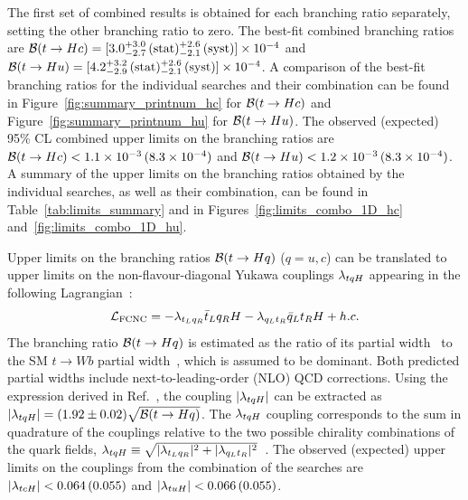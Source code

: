 The first set of combined results is obtained for each branching ratio separately, setting the other branching ratio to zero.
The best-fit combined branching ratios are $\mathcal{B}(t\to Hc)=[3.0^{+3.0}_{-2.7}\,(\mathrm{stat})^{+2.6}_{-2.1}\,(\mathrm{syst})] \times 10^{-4}$ and 
$\mathcal{B}(t\to Hu)=[4.2^{+3.2}_{-2.9}\,(\mathrm{stat})^{+2.6}_{-2.1}\,(\mathrm{syst})] \times 10^{-4}$.  
A comparison of the best-fit branching ratios for the individual searches and their combination can be found in Figure~\ref{fig:summary_printnum_hc} 
for $\mathcal{B}(t\to Hc)$ and Figure~\ref{fig:summary_printnum_hu} for $\mathcal{B}(t\to Hu)$.
The observed (expected) 95\% CL combined upper limits on the branching ratios are 
$\mathcal{B}(t\to Hc)<1.1 \times 10^{-3}\,(8.3 \times 10^{-4})$ and $\mathcal{B}(t\to Hu)<1.2 \times 10^{-3}\,(8.3 \times 10^{-4})$.
A summary of the upper limits on the branching ratios obtained by the individual searches, as well as their combination, 
can be found 
in Table~\ref{tab:limits_summary} and in Figures~\ref{fig:limits_combo_1D_hc} and~\ref{fig:limits_combo_1D_hu}.


Upper limits on the branching ratios $\mathcal{B}(t\to Hq)$ ($q=u,c$) can be translated to upper limits on the non-flavour-diagonal Yukawa couplings $\lambda_{tqH}$ 
appearing in the following Lagrangian~\cite{Harnik:2012pb}:
\begin{equation}
{\cal L}_\mathrm{FCNC} = -\lambda_{t_L q_R} \bar{t}_L q_R H - \lambda_{q_L t_R} \bar{q}_L t_R H  + h.c.
\end{equation}
The branching ratio $\mathcal{B}(t\to Hq)$ is estimated as the ratio of its partial width~\cite{Zhang:2013xya} to the SM $t \to Wb$ partial width~\cite{Denner:1990ns}, 
which is assumed to be dominant. Both predicted partial widths include next-to-leading-order (NLO) QCD corrections.
Using the expression derived in Ref.~\cite{Aad:2014dya}, the coupling $|\lambda_{tqH}|$ can be extracted as $| \lambda_{tqH} | = (1.92 \pm 0.02) \sqrt{\mathcal{B}(t\to Hq)}$.
The $\lambda_{tqH}$ coupling corresponds to the sum in quadrature of the couplings relative to the two possible chirality combinations of the quark fields, 
$\lambda_{tqH} \equiv \sqrt{ |\lambda_{t_Lq_R}|^2 +   |\lambda_{q_L t_R}|^2 }$~\cite{Harnik:2012pb}.
The observed (expected) upper limits on the couplings from the combination of the searches are $|\lambda_{tcH}|<0.064\,(0.055)$ and $|\lambda_{tuH}|<0.066\,(0.055)$.

